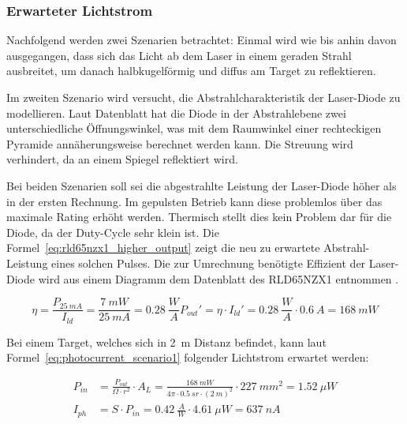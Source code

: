 \subsubsection{Erwarteter Lichtstrom}
Nachfolgend werden zwei Szenarien betrachtet: Einmal wird wie bis anhin davon ausgegangen, dass sich das Licht ab dem Laser
in einem geraden Strahl ausbreitet, um danach halbkugelförmig und diffus am Target zu reflektieren.

Im zweiten Szenario wird versucht, die Abstrahlcharakteristik der Laser-Diode zu modellieren. Laut Datenblatt hat die
Diode in der Abstrahlebene zwei unterschiedliche Öffnungswinkel, was mit dem Raumwinkel einer rechteckigen Pyramide
annäherungsweise berechnet werden kann. Die Streuung wird verhindert, da an einem Spiegel reflektiert wird.

Bei beiden Szenarien soll sei die abgestrahlte Leistung der Laser-Diode höher als in der ersten Rechnung. Im gepulsten
Betrieb kann diese problemlos über das maximale Rating erhöht werden. Thermisch stellt dies kein Problem dar für die Diode, da
der Duty-Cycle sehr klein ist. Die Formel~\ref{eq:rld65nzx1_higher_output} zeigt die neu zu erwartete Abstrahl-Leistung
eines solchen Pulses. Die zur Umrechnung benötigte Effizient der Laser-Diode wird aus einem Diagramm dem Datenblatt des
 RLD65NZX1 entnommen \cite{rohm2019rld65nzx1_datasheet}.

\begin{equation}\label{eq:rld65nzx1_higher_output}
    \eta = \frac{P_{25~mA}}{I_{ld}} = \frac{7~mW}{25~mA} = 0.28~\frac{W}{A}
    P_{out}' = \eta \cdot I_{ld}' = 0.28~\frac{W}{A} \cdot 0.6~A = 168~mW
\end{equation}

Bei einem Target, welches sich in 2~m Distanz befindet, kann laut Formel~\ref{eq:photocurrent_scenario1} folgender
Lichtstrom erwartet werden:

\begin{equation}\label{eq:photocurrent_scenario1}
    \begin{split}
        P_{in} &= \frac{P_{out}}{\Omega \cdot r^2} \cdot A_{L} = \frac{168~mW}{4\pi \cdot 0.5~sr \cdot (2~m)^2} \cdot 227~mm^2 = 1.52~\mu W\\
        I_{ph} &= S \cdot P_{in} = 0.42~\frac{A}{W} \cdot 4.61~\mu W = 637~nA
    \end{split}
\end{equation}

